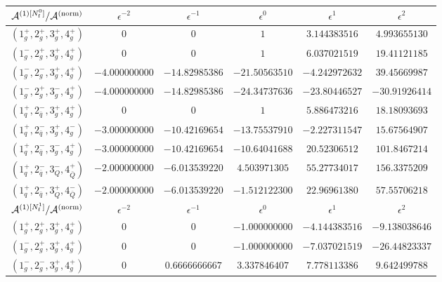 \begin{table}[h]
  \centering
  \begin{adjustbox}{width=1\textwidth}
    \begin{tabular}{cccccc}
      \toprule
      $\mathcal{A}^{(1)[N_\mathrm{f}^0]}/\mathcal{A}^\mathrm{(norm)}$   &   $\epsilon^{-2}$   &   $\epsilon^{-1}$   &   $\epsilon^{0}$   &   $\epsilon^{1}$  &  $\epsilon^{2}$ \\
      \midrule
      $(1_g^+,2_g^+,3_g^+,4_g^+)$ & $0$ & $0$ & $1$ & 
      $3.144383516$
      & $4.993655130$ \\
      $(1_g^-,2_g^+,3_g^+,4_g^+)$ & $0$ & $0$ & $1$ & 
      $6.037021519$
      & $19.41121185$ \\
      $(1_g^-,2_g^-,3_g^+,4_g^+)$ &  $-4.000000000$ &
      $-14.82985386$ &
      $-21.50563510$ & $-4.242972632$ & $39.45669987$ \\
      $(1_g^-,2_g^+,3_g^-,4_g^+)$ &  $-4.000000000$ &
      $-14.82985386$ & $-24.34737636$ & $-23.80446527$ &
      $-30.91926414$\\ \midrule
      $(1_q^+,2_{\bar q}^-,3_g^+,4_g^+)$ & $0$ & $0$ & $1$ &
      $5.886473216$  & $18.18093693$   \\
      $(1_q^+,2_{\bar q}^-,3_g^+,4_g^-)$ & $-3.000000000$ &
      $-10.42169654$ & $-13.75537910$ & $-2.227311547$ &
      $15.67564907$ \\
      $(1_q^+,2_{\bar q}^-,3_g^-,4_g^+)$ & $-3.000000000$ &
      $-10.42169654$ &
      $-10.64041688$ & $20.52306512$ & $101.8467214$ \\
      \midrule
      $(1_q^+,2_{\bar q}^-,3_Q^-,4_{\bar Q}^+)$ & $-2.000000000$ &
      $-6.013539220$  & $4.503971305$ & $55.27734017$ &
      $156.3375209$ \\
      $(1_q^+,2_{\bar q}^-,3_Q^+,4_{\bar Q}^-)$ & $-2.000000000$ &
      $-6.013539220$  & $-1.512122300$ & $22.96961380$ &
      $57.55706218$ \\
      \toprule
      $\mathcal{A}^{(1)[N_\mathrm{f}^1]}/\mathcal{A}^\mathrm{(norm)}$   &   $\epsilon^{-2}$   &   $\epsilon^{-1}$   &   $\epsilon^{0}$   &   $\epsilon^{1}$  &  $\epsilon^{2}$ \\
      \midrule
      $(1_g^+,2_g^+,3_g^+,4_g^+)$ & $0$ & $0$ & $-1.000000000$ &
      $-4.144383516$ & $-9.138038646$\\
      $(1_g^-,2_g^+,3_g^+,4_g^+)$ & $0$ & $0$ & $-1.000000000$ &
      $-7.037021519$ & $-26.44823337$ \\
      $(1_g^-,2_g^-,3_g^+,4_g^+)$ & $0$ & $0.6666666667$ &
      $3.337846407$ & $7.778113386$ & $9.642499788$ \\

\end{tabular}
\end{adjustbox}
\end{table}
